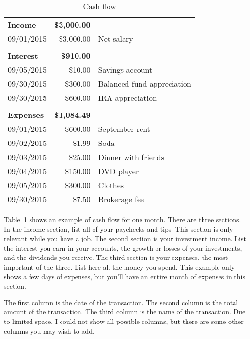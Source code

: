 \begin{table}[ht]
\caption{Cash flow}
\label{tab:cash-flow}
\centering
\begin{tabular}{l r l}
\\\hline
\\\hline
\textbf{Income} & \textbf{\$3,000.00}\\
\hline
09/01/2015 & \$3,000.00 & Net salary\\
\\
\textbf{Interest} & \textbf{\$910.00}\\
\hline
09/05/2015 & \$10.00 & Savings account\\
09/30/2015 & \$300.00 & Balanced fund appreciation\\
09/30/2015 & \$600.00 & IRA appreciation\\
\\
\textbf{Expenses} & \textbf{{\color{red} \-\$1,084.49}}\\
\hline
09/01/2015 & {\color{red} \-\$600.00} & September rent\\
{\color{blue} 09/02/2015} & {\color{red} \-\$1.99} & {\color{blue} Soda}\\
{\color{blue} 09/03/2015} & {\color{red} \-\$25.00} & {\color{blue} Dinner with friends}\\
09/04/2015 & {\color{red} \-\$150.00} & DVD player\\
09/05/2015 & {\color{red} \-\$300.00} & Clothes\\
09/30/2015 & {\color{red} \-\$7.50} & Brokerage fee\\
\hline
\end{tabular}
\end{table}

Table~\ref{tab:cash-flow} shows an example of cash flow for one month. There are three sections. In the income section, list all of your paychecks and tips. This section is only relevant while you have a job. The second section is your investment income. List the interest you earn in your accounts, the growth or losses of your investments, and the dividends you receive. The third section is your expenses, the most important of the three. List here all the money you spend. This example only shows a few days of expenses, but you'll have an entire month of expenses in this section. 

The first column is the date of the transaction. The second column is the total amount of the transaction. The third column is the name of the transaction. Due to limited space, I could not show all possible columns, but there are some other columns you may wish to add.

